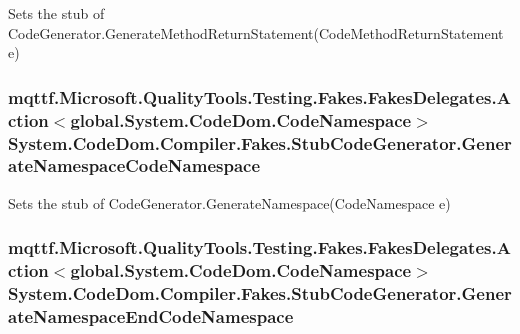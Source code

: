 Sets the stub of Code\-Generator.\-Generate\-Method\-Return\-Statement(\-Code\-Method\-Return\-Statement e)

\hypertarget{class_system_1_1_code_dom_1_1_compiler_1_1_fakes_1_1_stub_code_generator_ad8d6b6c71cd424b84a857c1855fbf13e}{
\subsubsection[{Generate\-Namespace\-Code\-Namespace}]{\setlength{\rightskip}{0pt plus 5cm}mqttf.\-Microsoft.\-Quality\-Tools.\-Testing.\-Fakes.\-Fakes\-Delegates.\-Action$<$global.\-System.\-Code\-Dom.\-Code\-Namespace$>$ System.\-Code\-Dom.\-Compiler.\-Fakes.\-Stub\-Code\-Generator.\-Generate\-Namespace\-Code\-Namespace}}\label{class_system_1_1_code_dom_1_1_compiler_1_1_fakes_1_1_stub_code_generator_ad8d6b6c71cd424b84a857c1855fbf13e}


Sets the stub of Code\-Generator.\-Generate\-Namespace(\-Code\-Namespace e)

\hypertarget{class_system_1_1_code_dom_1_1_compiler_1_1_fakes_1_1_stub_code_generator_a23557201dbbd7fd6b67d44d56219475e}{
\subsubsection[{Generate\-Namespace\-End\-Code\-Namespace}]{\setlength{\rightskip}{0pt plus 5cm}mqttf.\-Microsoft.\-Quality\-Tools.\-Testing.\-Fakes.\-Fakes\-Delegates.\-Action$<$global.\-System.\-Code\-Dom.\-Code\-Namespace$>$ System.\-Code\-Dom.\-Compiler.\-Fakes.\-Stub\-Code\-Generator.\-Generate\-Namespace\-End\-Code\-Namespace}}\label{class_system_1_1_code_dom_1_1_compiler_1_1_fakes_1_1_stub_code_generator_a23557201dbbd7fd6b67d44d56219475e}


